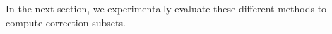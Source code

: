 \documentclass[twoside,11pt]{article}
\newcommand\comment[1]{\marginpar{\tiny #1}}
\renewcommand\comment[1]{#1}
\newcommand{\tias}[1]{{\comment{\color{blue}Tias:#1}}}
\newcommand{\emilio}[1]{{\comment{\color{red}Emilio: #1}}}
\newcommand{\bart}[1]{{\comment{\color{OliveGreen}Bart: #1}}}
\begin{document}

In the next section, we experimentally evaluate these different methods to compute correction subsets.
\end{document}
